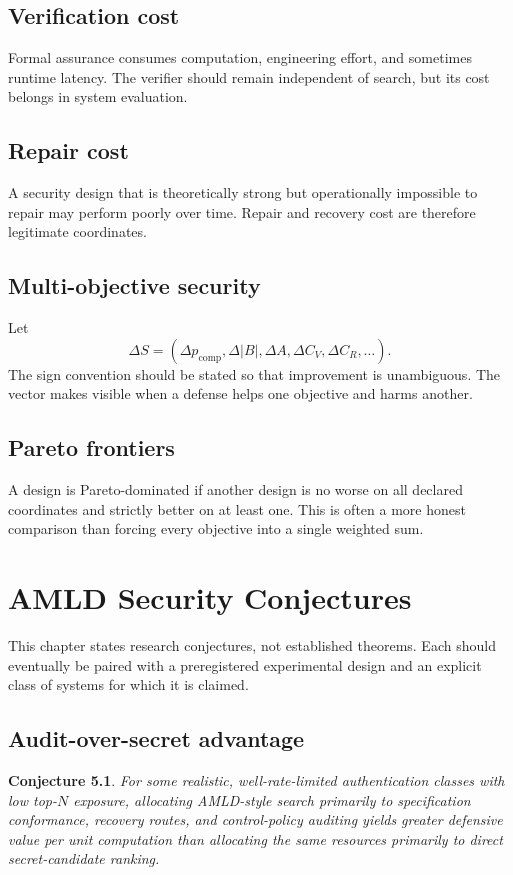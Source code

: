 \documentclass[11pt,oneside]{book}
\newtheorem{conjecture}[theorem]{Conjecture}
\theoremstyle{definition}
\theoremstyle{remark}
\begin{document}
\section{Verification cost}
Formal assurance consumes computation, engineering effort, and sometimes runtime latency. The verifier should remain independent of search, but its cost belongs in system evaluation.

\section{Repair cost}
A security design that is theoretically strong but operationally impossible to repair may perform poorly over time. Repair and recovery cost are therefore legitimate coordinates.

\section{Multi-objective security}
Let
\[
\Delta S=(\Delta p_{\mathrm{comp}},\Delta |B|,\Delta A,\Delta C_V,\Delta C_R,\ldots).
\]
The sign convention should be stated so that improvement is unambiguous. The vector makes visible when a defense helps one objective and harms another.

\section{Pareto frontiers}
A design is Pareto-dominated if another design is no worse on all declared coordinates and strictly better on at least one. This is often a more honest comparison than forcing every objective into a single weighted sum.

\chapter{AMLD Security Conjectures}
\label{ch:conjectures}
This chapter states research conjectures, not established theorems. Each should eventually be paired with a preregistered experimental design and an explicit class of systems for which it is claimed.

\section{Audit-over-secret advantage}
\begin{conjecture}
For some realistic, well-rate-limited authentication classes with low top-$N$ exposure, allocating AMLD-style search primarily to specification conformance, recovery routes, and control-policy auditing yields greater defensive value per unit computation than allocating the same resources primarily to direct secret-candidate ranking.
\end{conjecture}
\end{document}
